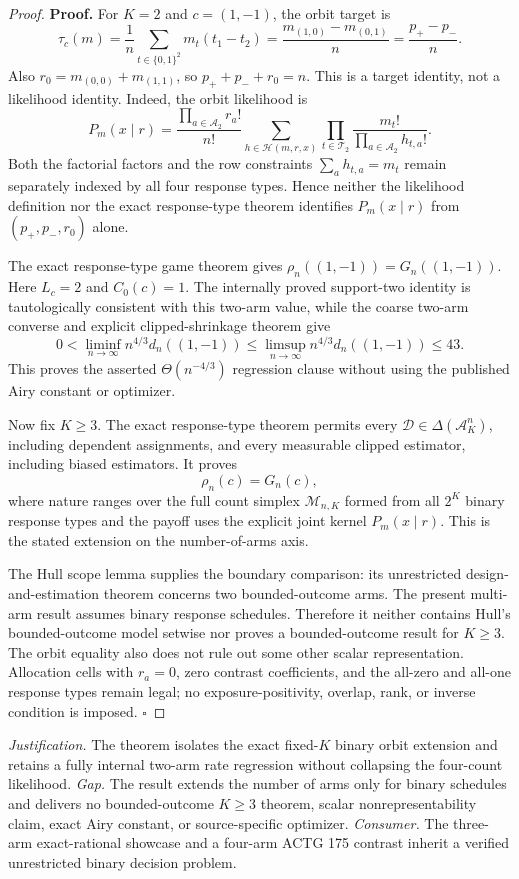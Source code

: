 \documentclass{article}
\begin{document}
\begin{proof}
\textbf{Proof.}
For \(K=2\) and \(c=(1,-1)\), the orbit target is
\[
 \tau_c(m)=\frac1n\sum_{t\in\{0,1\}^2}m_t(t_1-t_2)
 =\frac{m_{(1,0)}-m_{(0,1)}}n
 =\frac{p_+-p_-}{n}.
\]
Also \(r_0=m_{(0,0)}+m_{(1,1)}\), so \(p_++p_-+r_0=n\). This is a target identity, not a likelihood identity. Indeed, the orbit likelihood is
\[
 P_m(x\mid r)=\frac{\prod_{a\in\mathcal A_2}r_a!}{n!}
 \sum_{h\in\mathcal H(m,r,x)}
 \prod_{t\in\mathcal T_2}\frac{m_t!}{\prod_{a\in\mathcal A_2}h_{t,a}!}.
\]
Both the factorial factors and the row constraints \(\sum_a h_{t,a}=m_t\) remain separately indexed by all four response types. Hence neither the likelihood definition nor the exact response-type theorem identifies \(P_m(x\mid r)\) from \((p_+,p_-,r_0)\) alone.

The exact response-type game theorem gives \(\rho_n((1,-1))=G_n((1,-1))\). Here \(L_c=2\) and \(C_0(c)=1\). The internally proved support-two identity is tautologically consistent with this two-arm value, while the coarse two-arm converse and explicit clipped-shrinkage theorem give
\[
 0<\liminf_{n\to\infty}n^{4/3}d_n((1,-1))
 \leq\limsup_{n\to\infty}n^{4/3}d_n((1,-1))\leq43.
\]
This proves the asserted \(\Theta(n^{-4/3})\) regression clause without using the published Airy constant or optimizer.

Now fix \(K\geq3\). The exact response-type theorem permits every \(\mathcal D\in\Delta(\mathcal A_K^n)\), including dependent assignments, and every measurable clipped estimator, including biased estimators. It proves
\[
 \rho_n(c)=G_n(c),
\]
where nature ranges over the full count simplex \(\mathcal M_{n,K}\) formed from all \(2^K\) binary response types and the payoff uses the explicit joint kernel \(P_m(x\mid r)\). This is the stated extension on the number-of-arms axis.

The Hull scope lemma supplies the boundary comparison: its unrestricted design-and-estimation theorem concerns two bounded-outcome arms. The present multi-arm result assumes binary response schedules. Therefore it neither contains Hull's bounded-outcome model setwise nor proves a bounded-outcome result for \(K\geq3\). The orbit equality also does not rule out some other scalar representation. Allocation cells with \(r_a=0\), zero contrast coefficients, and the all-zero and all-one response types remain legal; no exposure-positivity, overlap, rank, or inverse condition is imposed. \(\square\)
\end{proof}
\par\smallskip\noindent \textit{Justification.} The theorem isolates the exact fixed-\(K\) binary orbit extension and retains a fully internal two-arm rate regression without collapsing the four-count likelihood. \textit{Gap.} The result extends the number of arms only for binary schedules and delivers no bounded-outcome \(K\geq3\) theorem, scalar nonrepresentability claim, exact Airy constant, or source-specific optimizer. \textit{Consumer.} The three-arm exact-rational showcase and a four-arm ACTG 175 contrast inherit a verified unrestricted binary decision problem.
\end{document}
